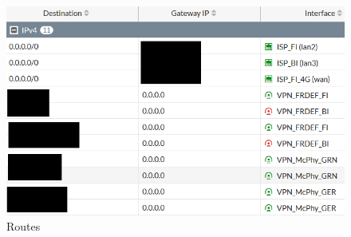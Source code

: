 \documentclass[french, a4paper]{beamer}
\begin{document}
\begin{frame}
\begin{minipage}{0.3\textwidth}
    \end{minipage}%
    \hfill
    \begin{minipage}{0.6\textwidth}
        \begin{figure}[h!]
            \centering
            \includegraphics[width = \linewidth]{img/fgt-auxr/routes.png}
            \caption{Routes}%
            \label{fig:fgt-auxr/routes}
        \end{figure}
    \end{minipage}
\end{frame}
\end{document}
